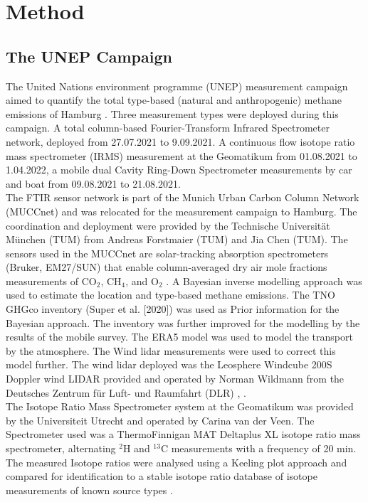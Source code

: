 \chapter{Method}
\label{chap:2}

\section{The UNEP Campaign}
The United Nations environment programme (UNEP) measurement campaign aimed to quantify the total type-based (natural and anthropogenic) methane emissions of Hamburg \cite{Forstmaier.2023}. Three measurement types were deployed during this campaign. A total column-based Fourier-Transform Infrared Spectrometer network, deployed from 27.07.2021 to 9.09.2021. A continuous flow isotope ratio mass spectrometer (IRMS) measurement at the Geomatikum from 01.08.2021 to 1.04.2022, a mobile dual Cavity Ring-Down Spectrometer measurements by car and boat from 09.08.2021 to 21.08.2021.\\
The FTIR sensor network is part of the Munich Urban Carbon Column Network (MUCCnet) and was relocated for the measurement campaign to Hamburg. The coordination and deployment were provided by the Technische Universität München (TUM) from Andreas Forstmaier (TUM) and Jia Chen (TUM). The sensors used in the MUCCnet are solar-tracking absorption spectrometers (Bruker, EM27/SUN) that enable column-averaged dry air mole fractions measurements of CO$_2$, CH$_4$, and O$_2$ \cite{Chen.2016}. A Bayesian inverse modelling approach was used to estimate the location and type-based methane emissions. The TNO GHGco inventory (Super et al. [2020]) was used as Prior information for the Bayesian approach. The inventory was further improved for the modelling by the results of the mobile survey. The ERA5 model \cite{Hersbach.2023} was used to model the transport by the atmosphere. The Wind lidar measurements were used to correct this model further. The wind lidar deployed was the Leosphere Windcube 200S Doppler wind LIDAR provided and operated by Norman Wildmann from the Deutsches Zentrum für Luft- und Raumfahrt (DLR) \cite{Wildmann.2020}, \cite{Vasiljevic.2016}.\\
The Isotope Ratio Mass Spectrometer system at the Geomatikum was provided by the Universiteit Utrecht and operated by Carina van der Veen. The Spectrometer used was a ThermoFinnigan MAT Deltaplus XL isotope ratio mass spectrometer, alternating $^2$H and $^{13}$C measurements with a frequency of 20 min. The measured Isotope ratios were analysed using a Keeling plot approach and compared for identification to a stable isotope ratio database of isotope measurements of known source types \cite{Menoud.2021}. \\
